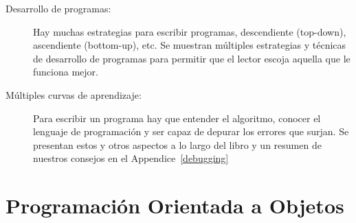 \begin{description}
\item[Desarrollo de programas:]
Hay muchas estrategias para escribir programas, descendiente (top-down), ascendiente (bottom-up), etc.
Se muestran múltiples estrategias y técnicas de desarrollo de programas para permitir que el lector escoja aquella que le funciona mejor.

\item[Múltiples curvas de aprendizaje:]
Para escribir un programa hay que entender el algoritmo, conocer el lenguaje de programación y ser capaz de depurar los errores que surjan.
Se presentan estos y otros aspectos a lo largo del libro y un resumen de nuestros consejos en el Appendice~\ref{debugging}



\end{description}

\section*{Programación Orientada a Objetos}

